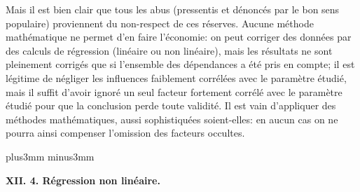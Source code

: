 Mais il est bien clair que tous les abus (pressentis et d\'enonc\'es par
le bon sens populaire) proviennent du non-respect de ces r\'eserves. 
Aucune m\'ethode math\'ematique ne permet d'en faire l'\'economie: on 
peut corriger des donn\'ees par des calculs de r\'egression (lin\'eaire
ou non lin\'eaire), mais les r\'esultats ne sont pleinement corrig\'es 
que si l'ensemble des d\'ependances a \'et\'e pris en compte; il est 
l\'egitime de n\'egliger les influences faiblement corr\'el\'ees avec le 
param\`etre \'etudi\'e, mais il suffit d'avoir ignor\'e un seul facteur 
fortement corr\'el\'e avec le param\`etre \'etudi\'e pour que la
conclusion perde toute validit\'e. Il est vain d'appliquer des
m\'ethodes math\'ematiques, aussi sophistiqu\'ees soient-elles: en 
aucun cas on ne pourra ainsi compenser l'omission des facteurs 
occultes. 
 
\vskip6mm plus3mm minus3mm 
 
{\bf XII. 4. R\'egression non lin\'eaire.} 

